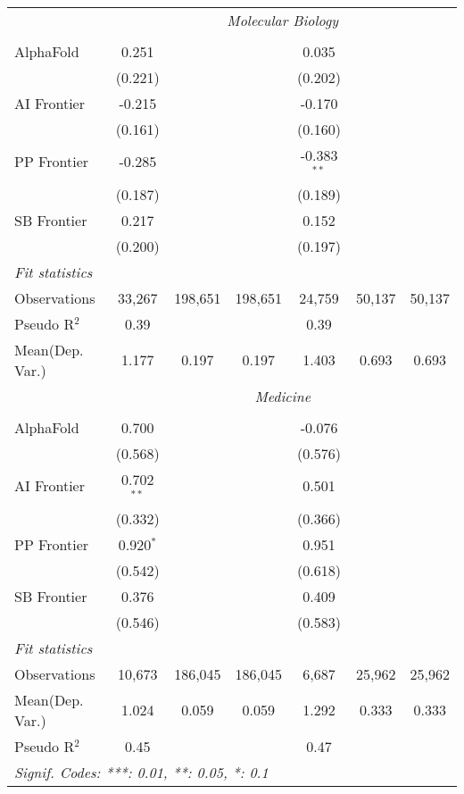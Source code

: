 \begin{tabular}{lcccccc}
 & \multicolumn{6}{c}{\textit{Molecular Biology}} \\ \\
   AlphaFold    & 0.251    &         &         & 0.035         &        &   \\   
                & (0.221)  &         &         & (0.202)       &        &   \\   
   AI Frontier  & -0.215   &         &         & -0.170        &        &   \\   
                & (0.161)  &         &         & (0.160)       &        &   \\   
   PP Frontier  & -0.285   &         &         & -0.383$^{**}$ &        &   \\   
                & (0.187)  &         &         & (0.189)       &        &   \\   
   SB Frontier  & 0.217    &         &         & 0.152         &        &   \\   
                & (0.200)  &         &         & (0.197)       &        &   \\   
   \midrule
   \emph{Fit statistics}\\
   Observations & 33,267   & 198,651 & 198,651 & 24,759        & 50,137 & 50,137\\  
   Pseudo R$^2$ & 0.39     &         &         & 0.39          &        & \\  
   
Mean(Dep. Var.) & 1.177 & 0.197 & 0.197 & 1.403 & 0.693 & 0.693 \\
 & \multicolumn{6}{c}{\textit{Medicine}} \\ \\
   AlphaFold    & 0.700        &         &         & -0.076  &        &   \\   
                & (0.568)      &         &         & (0.576) &        &   \\   
   AI Frontier  & 0.702$^{**}$ &         &         & 0.501   &        &   \\   
                & (0.332)      &         &         & (0.366) &        &   \\   
   PP Frontier  & 0.920$^{*}$  &         &         & 0.951   &        &   \\   
                & (0.542)      &         &         & (0.618) &        &   \\   
   SB Frontier  & 0.376        &         &         & 0.409   &        &   \\   
                & (0.546)      &         &         & (0.583) &        &   \\   
   \midrule
   \emph{Fit statistics}\\
   Observations & 10,673       & 186,045 & 186,045 & 6,687   & 25,962 & 25,962\\  
Mean(Dep. Var.) & 1.024 & 0.059 & 0.059 & 1.292 & 0.333 & 0.333 \\
   Pseudo R$^2$ & 0.45         &         &         & 0.47    &        & \\  
   \midrule \midrule
   \multicolumn{7}{l}{\emph{Signif. Codes: ***: 0.01, **: 0.05, *: 0.1}}\\
\end{tabular}
\par\endgroup
